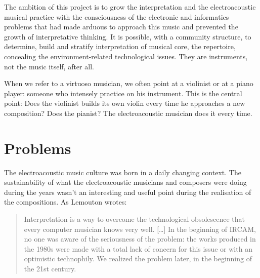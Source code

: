 \documentclass[twoside,a4paper]{article}
\begin{document}
The ambition of this project is to grow the interpretation and the electroacoustic musical practice with the consciousness of the electronic and informatics problems that had made arduous to approach this music and prevented the growth of interpretative thinking. It is possible, with a community structure, to determine, build and stratify interpretation of musical core, the repertoire, concealing the environment-related technological issues. They are instruments, not the music itself, after all.

When we refer to a virtuoso musician, we often point at a violinist or at a piano player: someone who intensely practice on his instrument. This is the central point: Does the violinist builds its own violin every time he approaches a new composition? Does the pianist? The electroacoustic musician does it every time.



\section{Problems}
\label{sec:problems}

The electroacoustic music culture was born in a daily changing context. The sustainability of what the electroacoustic musicians and composers were doing during the years wasn't an interesting and useful point during the realisation of the compositions. As Lemouton wrotes: 

\begin{quote}
Interpretation is a way to overcome the technological obsolescence that every computer musician knows very well. [\ldots] In the beginning of IRCAM, no one was aware of the seriousness of the problem: the works produced in the 1980s were made with a total lack of concern for this issue or with an optimistic technophily. We realized the problem later, in the beginning of the 21st century\cite{lem16}.
\end{quote}
\end{document}
